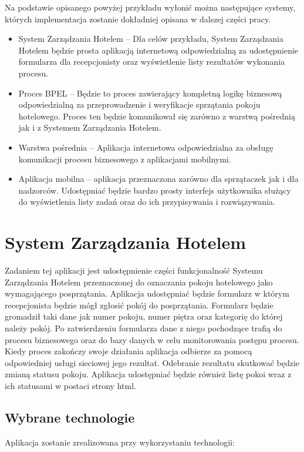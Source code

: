 Na podstawie opisanego powyżej przykładu wyłonić można następujące systemy, których implementacja zostanie dokładniej opisana w dalszej części pracy.

\begin{itemize}
\item System Zarządzania Hotelem -- Dla celów przykładu, System Zarządzania Hotelem będzie prosta aplikacją internetową odpowiedzialną za udostępnienie formularza dla recepcjonisty oraz wyświetlenie listy rezultatów wykonania procesu.   
\item Proces BPEL -- Będzie to proces zawierający kompletną logikę biznesową odpowiedzialną za przeprowadzenie i weryfikacje sprzątania pokoju hotelowego. Proces ten będzie komunikował się zarówno z warstwą pośrednią jak i z Systemem Zarządzania Hotelem. 
\item Warstwa pośrednia --  Aplikacja internetowa odpowiedzialna za obsługę komunikacji procesu biznesowego z aplikacjami mobilnymi. 
\item Aplikacja mobilna -- aplikacja przeznaczona zarówno dla sprzątaczek jak i dla nadzorców. Udostępniać będzie bardzo prosty interfejs użytkownika służący do wyświetlenia listy zadań oraz do ich przypisywania i rozwiązywania. 
\end{itemize}



\section{System Zarządzania Hotelem }
\label{sec:hotelManagementSystem}

Zadaniem tej aplikacji jest udostępnienie części funkcjonalność Systemu Zarządzania Hotelem przeznaczonej do oznaczania pokoju hotelowego jako wymagającego posprzątania. Aplikacja udostępniać będzie formularz w którym recepcjonista będzie mógł zgłosić pokój do posprzątania. Formularz będzie gromadził taki dane jak numer pokoju, numer piętra oraz kategorię do której należy pokój. Po zatwierdzeniu formularza  dane z niego pochodzące trafią do procesu biznesowego oraz do bazy danych w celu monitorowania postępu procesu. Kiedy proces zakończy swoje działania aplikacja odbierze za pomocą odpowiedniej usługi sieciowej jego rezultat. Odebranie rezultatu skutkować będzie zmianą statusu pokoju. Aplikacja udostępniać będzie również listę pokoi wraz z ich statusami w postaci strony html. 

\subsection{Wybrane technologie}
Aplikacja zostanie zrealizowana przy wykorzystaniu technologii:

